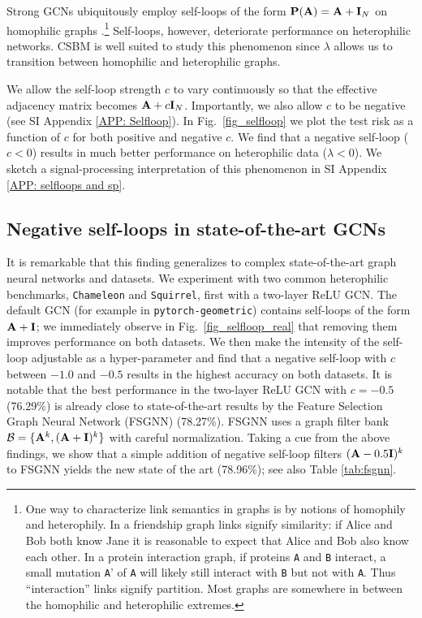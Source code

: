 \documentclass[9pt,twocolumn]{pnas-new}
\begin{document}
Strong GCNs ubiquitously employ self-loops of the form $\mathbf{P}(\mathbf{A}) = \mathbf{A} + \mathbf{I}_N$ on homophilic graphs \cite{kipf2017semisupervised,chien2021adaptive,velivckovic2017graph,wu2019simplifying,gasteiger2018predict}.\footnote{One way to characterize link semantics in graphs is by notions of homophily and heterophily. In a friendship graph links signify similarity: if Alice and Bob both know Jane it is reasonable to expect that Alice and Bob also know each other. In a protein interaction graph, if proteins \texttt{A} and \texttt{B} interact, a small mutation \texttt{A}' of \texttt{A} will likely still interact with \texttt{B} but not with \texttt{A}. Thus ``interaction'' links signify partition. Most graphs are somewhere in between the homophilic and heterophilic extremes.} Self-loops, however, deteriorate performance on heterophilic networks. CSBM is well suited to study this phenomenon since $\lambda$ allows us to transition between homophilic and heterophilic graphs. 

We allow the self-loop strength $c$ to vary continuously so that the effective adjacency matrix becomes $\mathbf{A} + c\mathbf{I}_N$. Importantly, we also allow $c$ to be negative (see SI Appendix \ref{APP: Selfloop}). In Fig.~\ref{fig_selfloop} we plot the test risk as a function of $c$ for both positive and negative $c$. We find that a negative self-loop ($c < 0$) results in much better performance on heterophilic data ($\lambda < 0$). We sketch a signal-processing interpretation of this phenomenon in SI Appendix \ref{APP: selfloops and sp}.



\subsection*{Negative self-loops in state-of-the-art GCNs}

It is remarkable that this finding generalizes to complex state-of-the-art graph neural networks and datasets. We experiment with two common heterophilic benchmarks, \texttt{Chameleon} and \texttt{Squirrel}, first with a two-layer ReLU GCN. The default GCN (for example in \texttt{pytorch-geometric}) contains self-loops of the form $\mathbf{A} + \mathbf{I}$; we immediately observe in Fig.~\ref{fig_selfloop_real} that removing them improves performance on both datasets. We then make the intensity of the self-loop adjustable as a hyper-parameter and find that a negative self-loop with $c$ between $-1.0$ and $-0.5$ results in the highest accuracy on both datasets. It is notable that the best performance in the two-layer ReLU GCN with $c=-0.5$ (76.29\%) is already close to state-of-the-art results by the Feature Selection Graph Neural Network (FSGNN) \cite{maurya2021improving} (78.27\%). FSGNN uses a graph filter bank $\mathcal{B}=\{\mathbf{A}^k,(\mathbf{A}+\mathbf{I})^k\}$ with careful normalization. Taking a cue from the above findings, we show that a simple addition of negative self-loop filters $(\mathbf{A}-0.5\mathbf{I})^k$ to FSGNN yields the new state of the art (78.96\%); see also Table \ref{tab:fsgnn}.
\end{document}
